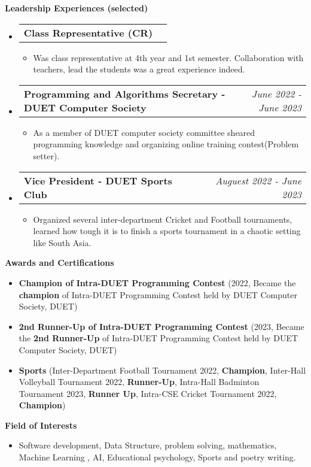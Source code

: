 \documentclass[legalpaper,10pt]{article}
\makeatletter
\newcommand{\resheading}[1]{{\large \colorbox{mygrey}{\begin{minipage}{\textwidth}{\textbf{#1 \vphantom{p\^{E}}}}\end{minipage}}}}
\newcommand{\ressubheading}[4]{
	\begin{tabular*}{7.1in}{l@{\extracolsep{\fill}}r}
		\textbf{#1} & \textit{#4} \\
	\end{tabular*}\vspace{-6pt}}
\makeatother
\begin{document}
	\resheading{Leadership Experiences (selected)}
	\begin{itemize}

            \item \ressubheading{Class Representative (CR)}{}{}{}
		\begin{itemize}
		    \item Was class representative at 4th year and 1st semester. Collaboration with            teachers, lead the students was a great experience indeed.
		\end{itemize}
            
		\item \ressubheading{Programming and Algorithms Secretary - DUET Computer Society}{}{}{June 2022 - June 2023}
		\begin{itemize}
		    \item As a member of DUET computer society committee sheared programming knowledge 
                and organizing online training contest(Problem setter).
		\end{itemize}
		
		\item \ressubheading{Vice President - DUET Sports Club}{}{}{Auguest 2022 - June 2023}
		\begin{itemize}
		    \item Organized several inter-department Cricket and Football tournaments, learned how tough it is to finish a sports tournament in a chaotic setting like South Asia.
		\end{itemize}
		
	\end{itemize}

	\vspace{0.15in}
	
	\resheading{Awards and Certifications}
	\begin{itemize}
	
		\item \textbf{Champion of Intra-DUET Programming Contest} (2022, Became the \textbf{champion} of Intra-DUET Programming Contest held by DUET Computer Society, DUET)
		
		\item \textbf{2nd Runner-Up of Intra-DUET Programming Contest} (2023, Became the \textbf{2nd Runner-Up} of Intra-DUET Programming Contest held by DUET Computer Society, DUET)

        \item \textbf{Sports} (Inter-Department Football Tournament 2022, \textbf{Champion}, Inter-Hall Volleyball Tournament 2022, \textbf{Runner-Up}, Intra-Hall Badminton Tournament 2023, \textbf{Runner Up}, Intra-CSE Cricket Tournament 2022, \textbf{Champion})

	\end{itemize}

	\vspace{0.20in}
	
	\resheading{Field of Interests}
		\begin{itemize}
			\item Software development, Data Structure, problem solving,  mathematics, Machine Learning , AI, Educational psychology, Sports and poetry writing.
		\end{itemize}
\end{document}
